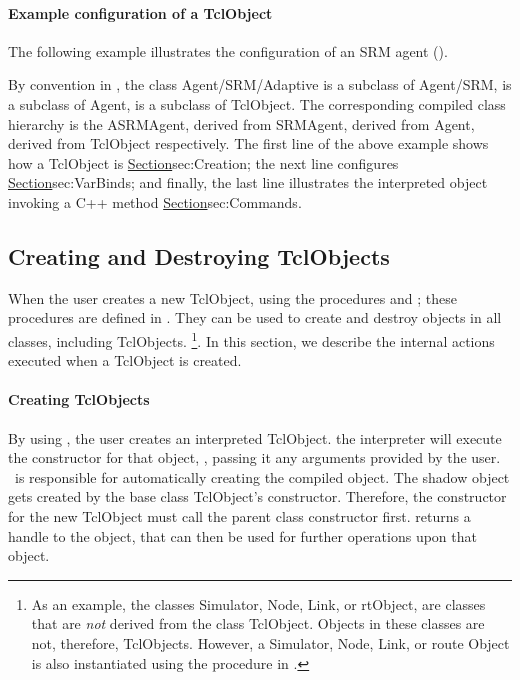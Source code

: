\paragraph{Example configuration of a TclObject}
The following example illustrates the configuration of
an SRM agent ().
By convention in \ns,
the class Agent/SRM/Adaptive is a subclass of Agent/SRM,
is a subclass of Agent, is a subclass of TclObject.
The corresponding compiled class hierarchy is
the ASRMAgent, derived from SRMAgent, derived from Agent,
derived from TclObject respectively.
The first line of the above example shows how a TclObject is 
\href{created (or destroyed)}{Section}{sec:Creation};
the next line configures
\href{a bound variable}{Section}{sec:VarBinds};
and finally, the last line illustrates
the interpreted object invoking a C++ method
\href{as if they were an instance procedure}{Section}{sec:Commands}.

\subsection{Creating and Destroying TclObjects}
\label{sec:Creation}

When the user creates a new TclObject,
using the procedures  and ;
these procedures are defined in .
They can be used to create and destroy objects in all classes,
including TclObjects.%
\footnote{As an example, the classes Simulator, Node, Link, or rtObject,
are classes that are \emph{not} derived from the class TclObject.
Objects in these classes  are not, therefore, TclObjects.
However, a Simulator, Node, Link, or route Object is also instantiated
using the  procedure in \ns.}.
In this section,
we describe the internal actions executed when a TclObject
is created.

\paragraph{Creating TclObjects}
By using , the user creates an interpreted TclObject.
the interpreter will execute the constructor for that object, ,
passing it any arguments provided by the user.
\ns\ is responsible for automatically  creating the compiled object.
The shadow object gets created by the base class TclObject's constructor.
Therefore, the constructor for the new TclObject
must call the parent class constructor first.
 returns a handle to the object, that can then be used
for further operations upon that object.

